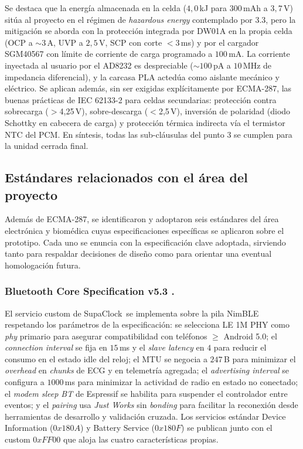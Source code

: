 \documentclass[letterpaper,11pt]{article}
\newcommand{\NombreProyecto}{SupaClock}
\begin{document}
Se destaca que la energ\'ia almacenada en la celda ($4{,}0$\,kJ para $300$\,mAh a $3{,}7$\,V) sit\'ua al proyecto en el r\'egimen de \textit{hazardous energy} contemplado por 3.3, pero la mitigaci\'on se aborda con la protecci\'on integrada por DW01A en la propia celda (OCP a $\sim 3$\,A, UVP a $2{,}5$\,V, SCP con corte $<3$\,ms) y por el cargador SGM40567 con l\'imite de corriente de carga programado a $100$\,mA. La corriente inyectada al usuario por el AD8232 es despreciable ($\sim 100$\,pA a $10$\,MHz de impedancia diferencial), y la carcasa PLA acted\'ua como aislante mec\'anico y el\'ectrico. Se aplican adem\'as, sin ser exigidas expl\'icitamente por ECMA-287, las buenas pr\'acticas de IEC 62133-2 \cite{en62133} para celdas secundarias: protecci\'on contra sobrecarga ($>$4{,}25\,V), sobre-descarga ($<$2{,}5\,V), inversi\'on de polaridad (diodo Schottky en cabecera de carga) y protecci\'on t\'ermica indirecta v\'ia el termistor NTC del PCM. En s\'intesis, todas las sub-cl\'ausulas del punto 3 se cumplen para la unidad cerrada final.

\subsection{Est\'andares relacionados con el \'area del proyecto}

Adem\'as de ECMA-287, se identificaron y adoptaron seis est\'andares del \'area electr\'onica y biom\'edica cuyas especificaciones espec\'ificas se aplicaron sobre el prototipo. Cada uno se enuncia con la especificaci\'on clave adoptada, sirviendo tanto para respaldar decisiones de dise\~no como para orientar una eventual homologaci\'on futura.

\subsubsection*{Bluetooth Core Specification v5.3 \cite{ble_core_spec}.}
El servicio custom de \NombreProyecto\ se implementa sobre la pila NimBLE \cite{nimble_ref} respetando los par\'ametros de la especificaci\'on: se selecciona LE 1M PHY como \textit{phy} primario para asegurar compatibilidad con tel\'efonos $\geq$ Android 5.0; el \textit{connection interval} se fija en $15$\,ms y el \textit{slave latency} en $4$ para reducir el consumo en el estado idle del reloj; el MTU se negocia a $247$\,B para minimizar el \textit{overhead} en \textit{chunks} de ECG y en telemetr\'ia agregada; el \textit{advertising interval} se configura a $1000$\,ms para minimizar la actividad de radio en estado no conectado; el \textit{modem sleep BT} de Espressif se habilita para suspender el controlador entre eventos; y el \textit{pairing} usa \textit{Just Works} sin \textit{bonding} para facilitar la reconexi\'on desde herramientas de desarrollo y validaci\'on cruzada. Los servicios est\'andar Device Information ($0x180A$) \cite{ble_gatt_devinfo} y Battery Service ($0x180F$) \cite{ble_gatt_battery} se publican junto con el custom $0xFF00$ que aloja las cuatro caracter\'isticas propias.
\end{document}
